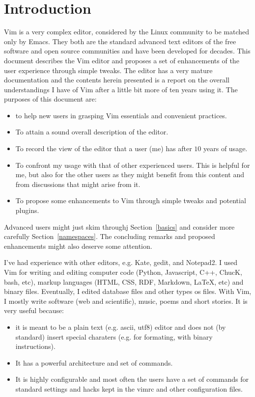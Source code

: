 \documentclass{article}
\begin{document}
\section{Introduction}\label{intro}
Vim is a very complex editor,
considered by the Linux community to be
matched only by Emacs.
They both are the standard advanced text editors
of the free software and open source communities
and have been developed for decades.
This document describes the Vim editor
and proposes a set of enhancements of the user
experience through simple tweaks.
The editor has a very mature documentation
and the contents herein presented is a
report on the overall understandings I
have of Vim after a little bit more
of ten years using it.
The purposes of this document are:
\begin{itemize}
  \item to help new users in grasping Vim essentials
  and convenient practices.
  \item To attain a sound overall description of the editor.
  \item To record the view of the editor that
  a user (me) has after $10$ years of usage.
  \item To confront my usage with that of other experienced
  users. This is helpful for me, but also for the other users
  as they might benefit from this content and from discussions
  that might arise from it.
  \item To propose some enhancements to Vim through simple tweaks and potential plugins.
\end{itemize}

Advanced users might just skim throughj
Section~\ref{basics} and consider more carefully
Section~\ref{namespaces}.
The concluding remarks and proposed enhancements
might also deserve some attention.

I've had experience with other editors, e.g. Kate, gedit, and Notepad2.
I used Vim for writing and editing computer code (Python, Javascript, C++, ChucK, bash, etc), markup languages (HTML, CSS, RDF, Markdown, \LaTeX, etc) and binary files.
Eventually, I edited database files and other types os files.
With Vim, I mostly write software (web and scientific),
music, poems and short stories.
It is very useful because:
\begin{itemize}
  \item it is meant to be a plain text (e.g. ascii, utf8) editor
  and does not (by standard) insert special charaters (e.g. for formating, with binary instructions).
  \item It has a powerful architecture and set of commands.
  \item It is highly configurable and most often the users
  have a set of commands for standard settings and hacks kept in the vimrc and other configuration files.
\end{itemize}
\end{document}
